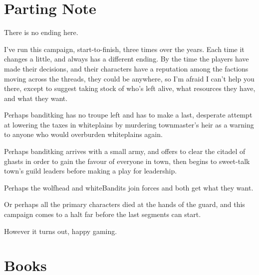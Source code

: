 \section*{Parting Note}

There is no ending here.

I've run this campaign, start-to-finish, three times over the years.
Each time it changes a little, and always has a different ending.
By the time the players have made their decisions, and their characters have a reputation among the factions moving across the \glspl{thread}, they could be anywhere, so I'm afraid I can't help you there, except to suggest taking stock of who's left alive, what resources they have, and what they want.

Perhaps \gls{banditking} has no troupe left and has to make a last, desperate attempt at lowering the taxes in \gls{whiteplains} by murdering \gls{townmaster}'s heir as a warning to anyone who would overburden \gls{whiteplains} again.

Perhaps \gls{banditking} arrives with a small army, and offers to clear the citadel of ghasts in order to gain the favour of everyone in \gls{town}, then begins to sweet-talk \gls{town}'s guild leaders before making a play for leadership.

Perhaps the \gls{wolfhead} and \gls{whiteBandits} join forces and both get what they want.

Or perhaps all the primary characters died at the hands of the \gls{guard}, and this campaign comes to a halt far before the last \glspl{segment} can start.

However it turns out, happy gaming.

\section{Books}
\label{bookAppendix}

